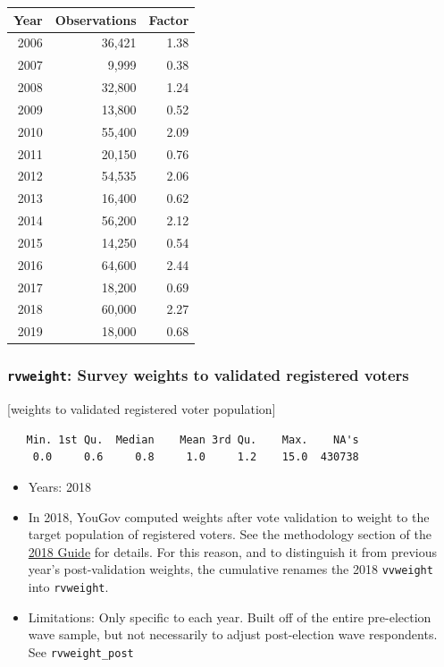 \documentclass[10pt,article,oneside]{memoir}
\theoremstyle{definition}
\begin{document}
\begin{center}


\begin{tabular}{rrr}
\toprule
Year & Observations & Factor\\
\midrule
2006 & 36,421 & 1.38\\
2007 & 9,999 & 0.38\\
2008 & 32,800 & 1.24\\
2009 & 13,800 & 0.52\\
2010 & 55,400 & 2.09\\
2011 & 20,150 & 0.76\\
2012 & 54,535 & 2.06\\
2013 & 16,400 & 0.62\\
2014 & 56,200 & 2.12\\
2015 & 14,250 & 0.54\\
2016 & 64,600 & 2.44\\
2017 & 18,200 & 0.69\\
2018 & 60,000 & 2.27\\
2019 & 18,000 & 0.68\\
\bottomrule
\end{tabular}
\end{center}

\hypertarget{rvweight-survey-weights-to-validated-registered-voters}{%
\subsubsection{\texorpdfstring{\texttt{rvweight}: Survey weights to
validated registered
voters}{rvweight: Survey weights to validated registered voters}}\label{rvweight-survey-weights-to-validated-registered-voters}}

{[}weights to validated registered voter population{]}

\begin{verbatim}
   Min. 1st Qu.  Median    Mean 3rd Qu.    Max.    NA's 
    0.0     0.6     0.8     1.0     1.2    15.0  430738 
\end{verbatim}

\begin{itemize}
\tightlist
\item
  Years: 2018
\item
  In 2018, YouGov computed weights after vote validation to weight to
  the target population of registered voters. See the methodology
  section of the \href{https://doi.org/10.7910/DVN/ZSBZ7K}{2018 Guide}
  for details. For this reason, and to distinguish it from previous
  year's post-validation weights, the cumulative renames the 2018
  \texttt{vvweight} into \texttt{rvweight}.
\item
  Limitations: Only specific to each year. Built off of the entire
  pre-election wave sample, but not necessarily to adjust post-election
  wave respondents. See \texttt{rvweight\_post}
\end{itemize}
\end{document}
